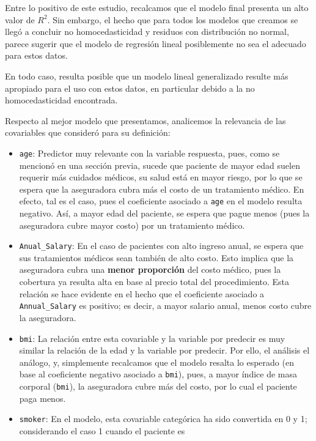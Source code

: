 \documentclass[
]{article}
\providecommand{\tightlist}{%
  \setlength{\itemsep}{0pt}\setlength{\parskip}{0pt}}
\begin{document}
Entre lo positivo de este estudio, recalcamos que el modelo final
presenta un alto valor de \(R^2\). Sin embargo, el hecho que para todos
los modelos que creamos se llegó a concluir no homocedasticidad y
residuos con distribución no normal, parece sugerir que el modelo de
regresión lineal posiblemente no sea el adecuado para estos datos.

En todo caso, resulta posible que un modelo lineal generalizado resulte
más apropiado para el uso con estos datos, en particular debido a la no
homocedasticidad encontrada.

Respecto al mejor modelo que presentamos, analicemos la relevancia de
las covariables que consideró para su definición:

\begin{itemize}
\tightlist
\item
  \texttt{age}: Predictor muy relevante con la variable respuesta, pues,
  como se mencionó en una sección previa, sucede que paciente de mayor
  edad suelen requerir más cuidados médicos, su salud está en mayor
  riesgo, por lo que se espera que la aseguradora cubra más el costo de
  un tratamiento médico. En efecto, tal es el caso, pues el coeficiente
  asociado a \texttt{age} en el modelo resulta negativo. Así, a mayor
  edad del paciente, se espera que pague menos (pues la aseguradora
  cubre mayor costo) por un tratamiento médico.
\item
  \texttt{Anual\_Salary}: En el caso de pacientes con alto ingreso
  anual, se espera que sus tratamientos médicos sean también de alto
  costo. Esto implica que la aseguradora cubra una \textbf{menor
  proporción} del costo médico, pues la cobertura ya resulta alta en
  base al precio total del procedimiento. Esta relación se hace evidente
  en el hecho que el coeficiente asociado a \texttt{Annual\_Salary} es
  positivo; es decir, a mayor salario anual, menos costo cubre la
  aseguradora.
\item
  \texttt{bmi}: La relación entre esta covariable y la variable por
  predecir es muy similar la relación de la edad y la variable por
  predecir. Por ello, el análisis el análogo, y, simplemente recalcamos
  que el modelo resalta lo esperado (en base al coeficiente negativo
  asociado a \texttt{bmi}), pues, a mayor índice de masa corporal
  (\texttt{bmi}), la aseguradora cubre más del costo, por lo cual el
  paciente paga menos.
\item
  \texttt{smoker}: En el modelo, esta covariable categórica ha sido
  convertida en 0 y 1; considerando el caso 1 cuando el paciente es

\end{itemize}
\end{document}
